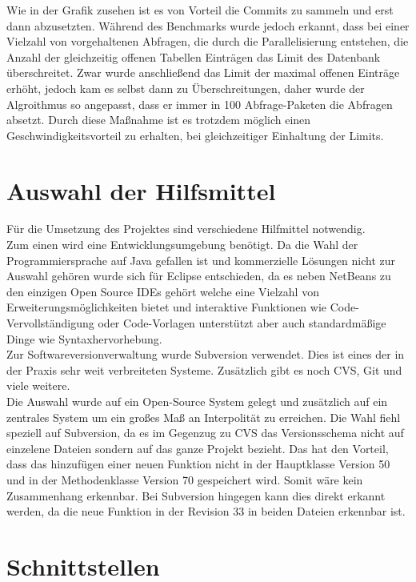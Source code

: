 Wie in der Grafik zusehen ist es von Vorteil die Commits zu sammeln und erst dann abzusetzten. Während des Benchmarks wurde jedoch erkannt, dass bei einer Vielzahl von vorgehaltenen Abfragen, die durch die Parallelisierung entstehen, die Anzahl der gleichzeitig offenen Tabellen Einträgen das Limit des Datenbank überschreitet. Zwar wurde anschließend das Limit der maximal offenen Einträge erhöht, jedoch kam es selbst dann zu Überschreitungen, daher wurde der Algroithmus so angepasst, dass er immer in 100 Abfrage-Paketen die Abfragen absetzt. Durch diese Maßnahme ist es trotzdem möglich einen Geschwindigkeitsvorteil zu erhalten, bei gleichzeitiger Einhaltung der Limits.

\section{Auswahl der Hilfsmittel}
\label{sec:hilfsmittelwahl}

Für die Umsetzung des Projektes sind verschiedene Hilfmittel notwendig.\\
Zum einen wird eine Entwicklungsumgebung benötigt.
Da die Wahl der Programmiersprache auf Java gefallen ist und kommerzielle Lösungen nicht zur Auswahl gehören wurde sich für Eclipse entschieden, da es neben NetBeans zu den einzigen Open Source IDEs gehört welche eine Vielzahl von Erweiterungsmöglichkeiten bietet und interaktive Funktionen wie Code-Vervollständigung oder Code-Vorlagen unterstützt aber auch standardmäßige Dinge wie Syntaxhervorhebung.\\

Zur Softwareversionverwaltung wurde Subversion verwendet. Dies ist eines der in der Praxis sehr weit verbreiteten Systeme. Zusätzlich gibt es noch CVS, Git und viele weitere.\\
Die Auswahl wurde auf ein Open-Source System gelegt und zusätzlich auf ein zentrales System um ein großes Maß an Interpolität zu erreichen. Die Wahl fiehl speziell auf Subversion, da es im Gegenzug zu CVS das Versionsschema nicht auf einzelene Dateien sondern auf das ganze Projekt bezieht. Das hat den Vorteil, dass das hinzufügen einer neuen Funktion nicht in der Hauptklasse Version 50 und in der Methodenklasse Version 70 gespeichert wird. Somit wäre kein Zusammenhang erkennbar. Bei Subversion hingegen kann dies direkt erkannt werden, da die neue Funktion in der Revision 33 in beiden Dateien erkennbar ist.\\

\section{Schnittstellen}
\label{sec:schnitt}


